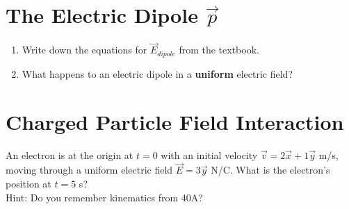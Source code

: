 \documentclass[12pt]{article}
\begin{document}
\section{The Electric Dipole $\vec{p}$} 

\begin{enumerate}[label=(\alph*)]
	\item Write down the equations for $\vec{E}_{dipole}$ from the textbook.
	
	\item What happens to an electric dipole in a {\bfseries uniform} electric field?
	
\end{enumerate}


\section{Charged Particle Field Interaction}

An electron is at the origin at $t = 0$ with an initial velocity $\vec{v} = 2\vec{x} + 1\vec{y}$ m/s, moving through a uniform electric field $\vec{E} = 3\vec{y}$ N/C. What is the electron's position at $t = 5$ s?
\\

\noindent 
Hint: Do you remember kinematics from 40A?
\end{document}
